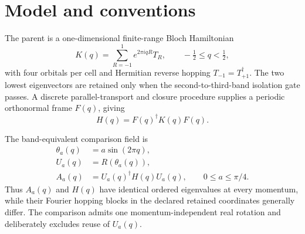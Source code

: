 \section{Model and conventions}

The parent is a one-dimensional finite-range Bloch Hamiltonian
\begin{equation}
 K(q)=\sum_{R=-1}^{1} e^{2\pi i qR}T_R,
 \qquad -\tfrac12\le q<\tfrac12,
\end{equation}
with four orbitals per cell and Hermitian reverse hopping
$T_{-1}=T_{+1}^{\dagger}$.  The two lowest eigenvectors are retained only when
the second-to-third-band isolation gate passes.  A discrete parallel-transport and
closure procedure supplies a periodic orthonormal frame $F(q)$, giving
\begin{equation}
 H(q)=F(q)^{\dagger}K(q)F(q).
\end{equation}

The band-equivalent comparison field is
\begin{align}
 \theta_a(q)&=a\sin(2\pi q),\\
 U_a(q)&=R(\theta_a(q)),\\
 A_a(q)&=U_a(q)^{\dagger}H(q)U_a(q),
 \qquad 0\le a\le\pi/4.
\end{align}
Thus $A_a(q)$ and $H(q)$ have identical ordered eigenvalues at every momentum, while
their Fourier hopping blocks in the declared retained coordinates generally differ.
The comparison admits one momentum-independent real rotation and deliberately excludes
reuse of $U_a(q)$.
